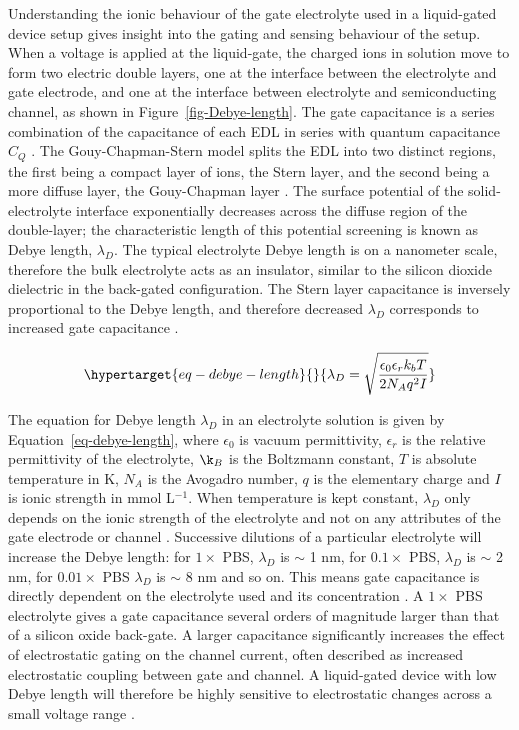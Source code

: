 \documentclass[
  a4paper,
]{scrbook}
\begin{document}
Understanding the ionic behaviour of the gate electrolyte used in a
liquid-gated device setup gives insight into the gating and sensing
behaviour of the setup. When a voltage is applied at the liquid-gate,
the charged ions in solution move to form two electric double layers,
one at the interface between the electrolyte and gate electrode, and one
at the interface between electrolyte and semiconducting channel, as
shown in Figure~\ref{fig-Debye-length}. The gate capacitance is a series
combination of the capacitance of each EDL in series with quantum
capacitance \(C_{Q}\) \autocite{Heller2010,Kireev2017,Shkodra2021}. The
Gouy-Chapman-Stern model splits the EDL into two distinct regions, the
first being a compact layer of ions, the Stern layer, and the second
being a more diffuse layer, the Gouy-Chapman layer
\autocite{Tiwari2022}. The surface potential of the solid-electrolyte
interface exponentially decreases across the diffuse region of the
double-layer; the characteristic length of this potential screening is
known as Debye length, \(\lambda_D\). The typical electrolyte Debye
length is on a nanometer scale, therefore the bulk electrolyte acts as
an insulator, similar to the silicon dioxide dielectric in the
back-gated configuration. The Stern layer capacitance is inversely
proportional to the Debye length, and therefore decreased \(\lambda_D\)
corresponds to increased gate capacitance
\autocite{Heller2010,Ohno2015,Shkodra2021,Yao2021}.

\begin{equation}\protect\hypertarget{eq-debye-length}{}{
\lambda_D = \sqrt{\frac{\epsilon_0\epsilon_rk_bT}{2N_Aq^2I}}
}\label{eq-debye-length}\end{equation}

The equation for Debye length \(\lambda_D\) in an electrolyte solution
is given by Equation~\ref{eq-debye-length}, where \(\epsilon_0\) is
vacuum permittivity, \(\epsilon_r\) is the relative permittivity of the
electrolyte, \(\k_B\) is the Boltzmann constant, \(T\) is absolute
temperature in K, \(N_A\) is the Avogadro number, \(q\) is the
elementary charge and \(I\) is ionic strength in mmol L\(^{-1}\). When
temperature is kept constant, \(\lambda_D\) only depends on the ionic
strength of the electrolyte and not on any attributes of the gate
electrode or channel \autocite{Stern2007,Shkodra2021}. Successive
dilutions of a particular electrolyte will increase the Debye length:
for \(1 \times\) PBS, \(\lambda_D\) is \(\sim\) 1 nm, for \(0.1 \times\)
PBS, \(\lambda_D\) is \(\sim\) 2 nm, for \(0.01 \times\) PBS
\(\lambda_D\) is \(\sim\) 8 nm and so on. This means gate capacitance is
directly dependent on the electrolyte used and its concentration
\autocite{Kireev2017,Shkodra2021}. A \(1 \times\) PBS electrolyte gives
a gate capacitance several orders of magnitude larger than that of a
silicon oxide back-gate. A larger capacitance significantly increases
the effect of electrostatic gating on the channel current, often
described as increased electrostatic coupling between gate and channel.
A liquid-gated device with low Debye length will therefore be highly
sensitive to electrostatic changes across a small voltage range
\autocite{Heller2010,Ohno2015,Kireev2017,Yao2021}.
\end{document}
